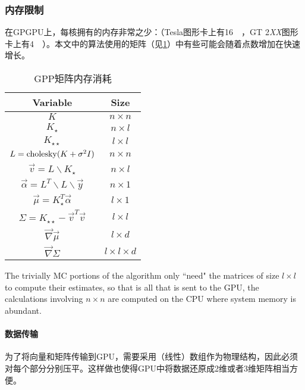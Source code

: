 \documentclass[index]{subfiles}
\begin{document}
\subsubsection{内存限制} %
\label{sub:Memory Restrictions}

在GPGPU上，每核拥有的内存非常之少：（Tesla图形卡上有\SI{16}{\kilo\byte}，GT 2{\it XX}图形卡上有\SI{4}{\kilo\byte}）。本文中的算法使用的矩阵（见\cref{EPImemory}）中有些可能会随着点数增加在快速增长。

\begin{table}
    \caption{GPP矩阵内存消耗}
    \label{EPImemory}
\begin{center}
    \begin{tabular}{c|c}
    Variable & Size \\
    \hline
    $K$ & $n \times n$ \\
    $K_{\star }$ & $n \times l$ \\
    $K_{\star \star }$ & $l \times l$ \\
    $L = {\rm cholesky}(K + \sigma^{2}I) $ & $n \times n$ \\
    $\vec{v} = L \backslash K_{\star }$ & $n \times l$ \\
    $\vec{\alpha} = L^{T} \backslash L \backslash \vec{y}$ & $n \times 1$ \\
    $\vec{\mu} = K_{\star }^{T}\vec{\alpha}$ & $l \times 1$  \\
    $\Sigma = K_{\star \star} - \vec{v}^{T}\vec{v}$ & $l \times l$ \\
    $\vec{\nabla} \vec{\mu}$ & $l \times d$ \\
    $\vec{\nabla} \Sigma$ & $l \times l \times d$
    \end{tabular}
\end{center}
\end{table}

The trivially MC portions of the algorithm only ``need" the matrices of size $l \times l$ to compute their estimates, so that is all that is sent to the GPU, the calculations involving $n \times n$ are computed on the CPU where system memory is abundant.

\paragraph{数据传输} %
\label{ssub:Memory Transfer}

为了将向量和矩阵传输到GPU，需要采用（线性）数组作为物理结构，因此必须对每个部分分别压平。这样做也使得GPU中将数据还原成2维或者3维矩阵相当方便。
\end{document}

